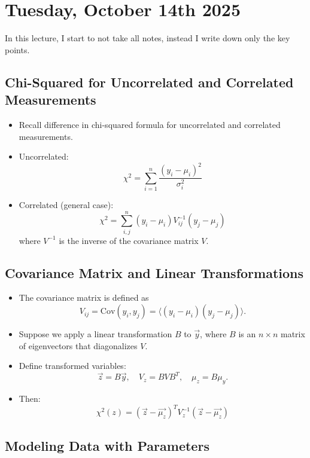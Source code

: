 \section{Tuesday, October 14th 2025}

In this lecture, I start to not take all notes, instead I write down only the key points.

\subsection{Chi-Squared for Uncorrelated and Correlated Measurements}

\begin{itemize}
      \item Recall difference in chi-squared formula for uncorrelated and correlated measurements.
      \item Uncorrelated:
            \[
                  \chi^2 = \sum_{i=1}^{n} \frac{(y_i - \mu_i)^2}{\sigma_i^2}
            \]
      \item Correlated (general case):
            \[
                  \chi^2 = \sum_{i, j}^{n} (y_i - \mu_i) V^{-1}_{ij} (y_j - \mu_j)
            \]
            where $V^{-1}$ is the inverse of the covariance matrix $V$.
\end{itemize}

\subsection{Covariance Matrix and Linear Transformations}

\begin{itemize}
      \item The covariance matrix is defined as
            \[
                  V_{ij} = \mathrm{Cov}(y_i, y_j) = \langle (y_i - \mu_i)(y_j - \mu_j) \rangle .
            \]
      \item Suppose we apply a linear transformation $B$ to $\vec{y}$, where $B$ is an $n \times n$ matrix of eigenvectors that diagonalizes $V$.
      \item Define transformed variables:
            \[
                  \vec{z} = B \vec{y}, \quad V_z = B V B^T, \quad \mu_z = B \mu_y .
            \]
      \item Then:
            \[
                  \boxed{\chi^2(z) = \left( \vec{z} - \vec{\mu_z} \right)^T V_z^{-1} \left( \vec{z} - \vec{\mu_z} \right)}
            \]
\end{itemize}

\subsection{Modeling Data with Parameters}

